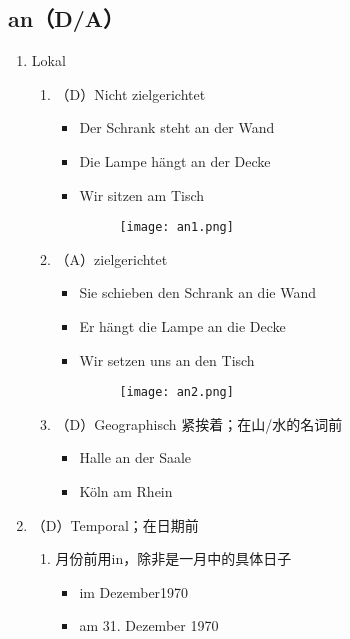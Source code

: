 \documentclass[UTF8]{report}
\begin{document}
\subsection{an（D/A）}
\begin{enumerate}
    \item Lokal
    \begin{enumerate}
        \item （D）Nicht zielgerichtet
        \begin{itemize}
            \item Der Schrank steht an der Wand
            \item Die Lampe hängt an der Decke
            \item Wir sitzen am Tisch
            \begin{figure}[H]
                \centering
                \texttt{[image: an1.png]}
            \end{figure}
        \end{itemize}
        \item （A）zielgerichtet
        \begin{itemize}
            \item Sie schieben den Schrank an die Wand
            \item Er hängt die Lampe an die Decke
            \item Wir setzen uns an den Tisch
            \begin{figure}[H]
                \centering
                \texttt{[image: an2.png]}
            \end{figure}
        \end{itemize}
        \item （D）Geographisch 紧挨着；在山/水的名词前
        \begin{itemize}
            \item Halle an der Saale
            \item Köln am Rhein
        \end{itemize}
    \end{enumerate}
    \item （D）Temporal；在日期前
    \begin{enumerate}
        \item 月份前用in，除非是一月中的具体日子
        \begin{itemize}
            \item im Dezember1970
            \item am 31. Dezember 1970
        \end{itemize}
    \end{enumerate}
\end{enumerate}
\end{document}
